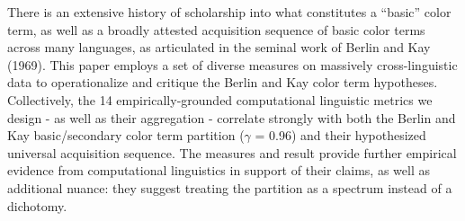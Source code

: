 There is an extensive history of scholarship into what constitutes a ``basic'' color term, as well as a broadly attested acquisition sequence of basic color terms across many languages, as articulated in the seminal work of Berlin and Kay (1969). This paper employs a set of diverse measures on massively cross-linguistic data to operationalize and critique the Berlin and Kay color term hypotheses. Collectively, the 14 empirically-grounded computational linguistic metrics we design - as well as their aggregation - correlate strongly with both the Berlin and Kay basic/secondary color term partition ($\gamma$ = 0.96) and their hypothesized universal acquisition sequence. The measures and result provide further empirical evidence from computational linguistics in support of their claims, as well as additional nuance: they suggest treating the partition as a spectrum instead of a dichotomy.
